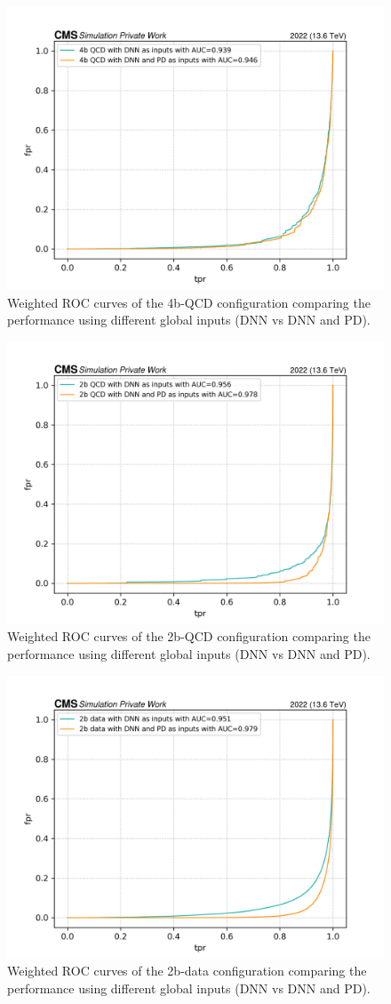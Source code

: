 \begin{figure}[hbt]
    \centering
    \includegraphics[width=0.7\linewidth]{Images/7.S:B/Inputs/4b QCD bis.png}
    \caption{Weighted ROC curves of the 4b-QCD configuration comparing the performance using different global inputs (DNN vs DNN and PD).}
    \label{fig: 4b QCD comp input}
\end{figure}

\begin{figure}[hbt]
    \centering
    \includegraphics[width=0.7\linewidth]{Images/7.S:B/Inputs/2b QCD.png}
    \caption{Weighted ROC curves of the 2b-QCD configuration comparing the performance using different global inputs (DNN vs DNN and PD).}
    \label{fig: 2b QCD comp input}
\end{figure}

\begin{figure}[hbt]
    \centering
    \includegraphics[width=0.7\linewidth]{Images/7.S:B/Inputs/2b data.png}
    \caption{Weighted ROC curves of the 2b-data configuration comparing the performance using different global inputs (DNN vs DNN and PD).}
    \label{fig: 2b data comp input}
\end{figure}

